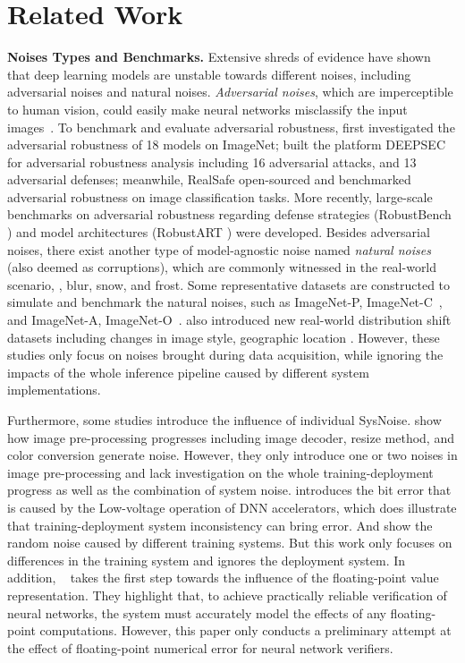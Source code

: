 \section{Related Work}
\textbf{Noises Types and Benchmarks.} Extensive shreds of evidence have shown that deep learning models are unstable towards different noises, including adversarial noises and natural noises. \emph{Adversarial noises}, which are imperceptible to human vision, could easily make neural networks misclassify the input images~\cite{szegedy2013intriguing,fgsm,liu2022harnessing,liu2023x,Liu2019Perceptual,liang2021parallel,Wang_2021_CVPR,liu2020bias,liu2020spatiotemporal}. To benchmark and evaluate adversarial robustness, \cite{su2018is} first investigated the adversarial robustness of 18 models on ImageNet; \cite{Ling2019Deepsec} built the  platform DEEPSEC for adversarial robustness analysis including 16 adversarial attacks, and 13 adversarial defenses; meanwhile, RealSafe \cite{Dong2020Benchmarking} open-sourced and benchmarked adversarial robustness on image classification tasks. More recently, large-scale benchmarks on adversarial robustness regarding defense strategies (RobustBench \cite{croce2020robustbench}) and model architectures (RobustART \cite{tang2021robustart,liu2023exploring}) were developed. Besides adversarial noises, there exist another type of model-agnostic noise named \emph{natural noises} (also deemed as corruptions), which are commonly witnessed in the real-world scenario, \eg, blur, snow, and frost. Some representative datasets are constructed to simulate and benchmark the natural noises, such as ImageNet-P, ImageNet-C~\cite{hendrycks2019robustness}, and ImageNet-A, ImageNet-O~\cite{hendrycks2021nae}. \cite{hendrycks2020many} also introduced new real-world distribution shift datasets including changes in image style, geographic location \etc. However, these studies only focus on noises brought during data acquisition, while ignoring the impacts of the whole inference pipeline caused by different system implementations.

Furthermore, some studies introduce the influence of individual SysNoise. \cite{yan2021real, boltaevich2019estimationresize} show how image pre-processing progresses including image decoder, resize method, and color conversion generate noise. However, they only introduce one or two noises in image pre-processing and lack investigation on the whole training-deployment progress as well as the combination of system noise.
\cite{biterror} introduces the bit error that is caused by the Low-voltage operation of DNN accelerators, which does illustrate that training-deployment system inconsistency can bring error. And \cite{randomnessintraining} show the random noise caused by different training systems. But this work only focuses on differences in the training system and ignores the deployment system.
In addition, ~\cite{jia2021exploiting} takes the first step towards the influence of the floating-point value representation. They highlight that, to achieve practically reliable verification of neural networks, the system must accurately model the effects of any floating-point computations. However, this paper only conducts a preliminary attempt at the effect of floating-point numerical error for neural network verifiers. 

